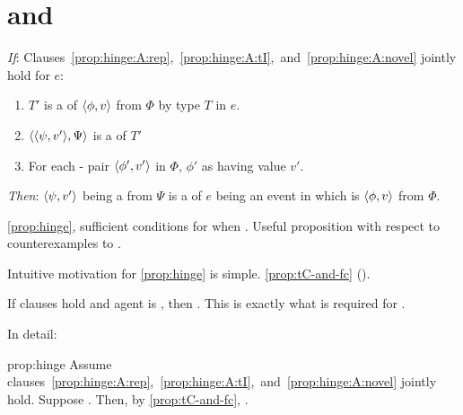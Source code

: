 \chapter{ and \tC{}}
\label{sec:typicalRequs}



\begin{note}
  \begin{proposition}
    \label{prop:hinge}
    \vspace{-\baselineskip}
    \begin{itenum}
    \item[\emph{If}:]
      Clauses~\ref{prop:hinge:A:rep},~\ref{prop:hinge:A:tI},~and~\ref{prop:hinge:A:novel} jointly hold for \(e\):
      \begin{enumerate}[label=\arabic*., ref=\arabic*]
      \item
        \label{prop:hinge:A:rep}
        \(T'\) is a \tRep{} of \vAgent{} \tCV{} \(\langle \phi, v \rangle\) from \(\Phi\) by type \(T\) in \(e\).
      \item
        \label{prop:hinge:A:tI}
        \(\langle \langle \psi, v' \rangle, \Psi \rangle\) is a \tI{} of \(T'\)
      \item
        \label{prop:hinge:A:novel}
        {
          \color{red}
          For each - pair \(\langle \phi', v' \rangle\) in \(\Phi\), \vAgent{} \evals{} \(\phi'\) as having value \(v'\).
        }
      \end{enumerate}
    \item[\emph{Then}:]
      \(\langle \psi, v' \rangle\) being a \fc{} from \(\Psi\) is a \requ{} of \(e\) being an event in which \vAgent{} is \tCV{} \(\langle \phi, v \rangle\) from \(\Phi\).
    \end{itenum}
    \vspace{-\baselineskip}
  \end{proposition}

  \noindent%
  \autoref{prop:hinge}, sufficient conditions for \requ{} when \tCV{}.
  Useful proposition with respect to counterexamples to \issueConstraint{}.

  Intuitive motivation for \autoref{prop:hinge} is simple.
  \autoref{prop:tC-and-fc} ().

  If clauses hold and agent is \tCV{}, then \fc{}.
  This is exactly what is required for \requ{}.

  In detail:

  \begin{argument}{prop:hinge}
    Assume~ clauses~\ref{prop:hinge:A:rep},~\ref{prop:hinge:A:tI},~and~\ref{prop:hinge:A:novel} jointly hold.
    Suppose \tCV{}.
    Then, by \autoref{prop:tC-and-fc}, \fc{}.


\end{argument}
\end{note}
